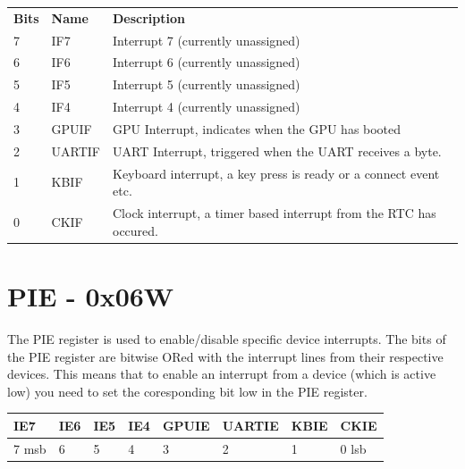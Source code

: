 \documentclass[a4paper,10pt]{book}
\begin{document}
\noindent
\begin{tabular}{llp{7cm}}
 \textbf{Bits}&\textbf{Name}&\textbf{Description}\\
 7&IF7&Interrupt 7 (currently unassigned)\\
 6&IF6&Interrupt 6 (currently unassigned)\\
 5&IF5&Interrupt 5 (currently unassigned)\\
 4&IF4&Interrupt 4 (currently unassigned)\\
 3&GPUIF&GPU Interrupt, indicates when the GPU has booted\\
 2&UARTIF&UART Interrupt, triggered when the UART receives a byte.\\
 1&KBIF&Keyboard interrupt, a key press is ready or a connect event etc.\\
 0&CKIF&Clock interrupt, a timer based interrupt from the RTC has occured.\\
\end{tabular}

\section{PIE - 0x06W}
The PIE register is used to enable/disable specific device interrupts.  The bits
of the PIE register are bitwise ORed with the interrupt lines from their
respective devices.  This means that to enable an interrupt from a device (which
is active low) you need to set the coresponding bit low in the PIE register.
\vspace{12pt}

\noindent
\begin{tabularx}{\textwidth}{| X | X | X | X | X | X | X | X |}
 \hline
  IE7&IE6&IE5&IE4&GPUIE&UARTIE&KBIE&CKIE\\
 \hline
  7 msb&6&5&4&3&2&1&0 lsb\\
 \hline
\end{tabularx}

\vspace{12pt}
\end{document}
